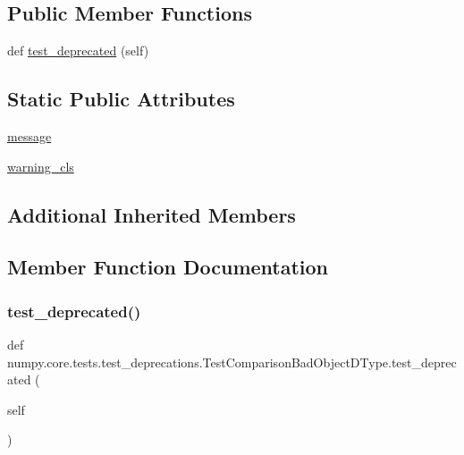 \subsection*{Public Member Functions}
\begin{DoxyCompactItemize}
\item 
def \hyperlink{classnumpy_1_1core_1_1tests_1_1test__deprecations_1_1TestComparisonBadObjectDType_a808c098c4865d5c887855dbddabe6c50}{test\+\_\+deprecated} (self)
\end{DoxyCompactItemize}
\subsection*{Static Public Attributes}
\begin{DoxyCompactItemize}
\item 
\hyperlink{classnumpy_1_1core_1_1tests_1_1test__deprecations_1_1TestComparisonBadObjectDType_a09a12937be3dd020c92c5817a3b954d3}{message}
\item 
\hyperlink{classnumpy_1_1core_1_1tests_1_1test__deprecations_1_1TestComparisonBadObjectDType_a352998c0e790a5842f48a412627c5a53}{warning\+\_\+cls}
\end{DoxyCompactItemize}
\subsection*{Additional Inherited Members}


\subsection{Member Function Documentation}
\mbox{\label{classnumpy_1_1core_1_1tests_1_1test__deprecations_1_1TestComparisonBadObjectDType_a808c098c4865d5c887855dbddabe6c50}} 
\subsubsection{\texorpdfstring{test\+\_\+deprecated()}{test\_deprecated()}}
{\footnotesize\ttfamily def numpy.\+core.\+tests.\+test\+\_\+deprecations.\+Test\+Comparison\+Bad\+Object\+D\+Type.\+test\+\_\+deprecated (\begin{DoxyParamCaption}\item[{}]{self }\end{DoxyParamCaption})}



